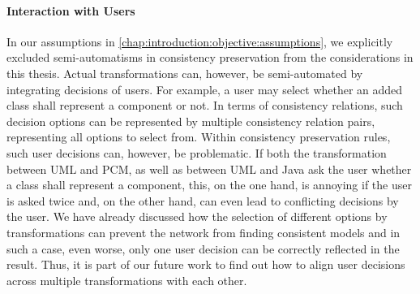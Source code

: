 
\paragraph{Interaction with Users}
In our assumptions in \autoref{chap:introduction:objective:assumptions}, we explicitly excluded semi-automatisms in consistency preservation from the considerations in this thesis.
Actual transformations can, however, be semi-automated by integrating decisions of users.
For example, a user may select whether an added class shall represent a component or not.
In terms of consistency relations, such decision options can be represented by multiple consistency relation pairs, representing all options to select from.
Within consistency preservation rules, such user decisions can, however, be problematic.
If both the transformation between \gls{UML} and \gls{PCM}, as well as between \gls{UML} and Java ask the user whether a class shall represent a component, this, on the one hand, is annoying if the user is asked twice and, on the other hand, can even lead to conflicting decisions by the user.
We have already discussed how the selection of different options by transformations can prevent the network from finding consistent models and in such a case, even worse, only one user decision can be correctly reflected in the result.
Thus, it is part of our future work to find out how to align user decisions across multiple transformations with each other.

